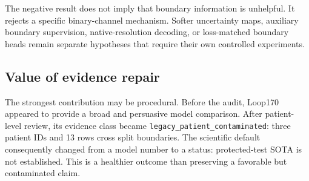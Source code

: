 The negative result does not imply that boundary information is unhelpful. It rejects a specific binary-channel mechanism. Softer uncertainty maps, auxiliary boundary supervision, native-resolution decoding, or loss-matched boundary heads remain separate hypotheses that require their own controlled experiments.

\subsection{Value of evidence repair}

The strongest contribution may be procedural. Before the audit, Loop170 appeared to provide a broad and persuasive model comparison. After patient-level review, its evidence class became \texttt{legacy\_patient\_contaminated}: three patient IDs and 13 rows cross split boundaries. The scientific default consequently changed from a model number to a status: protected-test SOTA is not established. This is a healthier outcome than preserving a favorable but contaminated claim.
